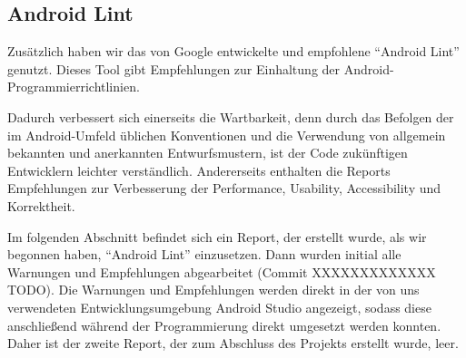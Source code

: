 



\clearpage
\subsection{Android Lint}

Zusätzlich haben wir das von Google entwickelte und empfohlene ``Android Lint''
genutzt. Dieses Tool gibt Empfehlungen zur Einhaltung der Android-Programmierrichtlinien.

Dadurch verbessert sich einerseits die Wartbarkeit, denn durch das Befolgen der im Android-Umfeld üblichen
 Konventionen und die Verwendung von allgemein bekannten und anerkannten Entwurfsmustern, ist der Code zukünftigen
Entwicklern leichter verständlich.
Andererseits enthalten die Reports Empfehlungen zur Verbesserung der Performance, Usability, Accessibility und Korrektheit.

Im folgenden Abschnitt befindet sich ein Report, der erstellt wurde,
als wir begonnen haben, ``Android Lint'' einzusetzen. Dann wurden initial alle
Warnungen und Empfehlungen abgearbeitet (Commit XXXXXXXXXXXXX TODO).
Die Warnungen und Empfehlungen werden direkt in der von uns verwendeten
Entwicklungsumgebung Android Studio angezeigt, sodass diese anschließend während
der Programmierung direkt umgesetzt werden konnten. Daher ist der zweite Report,
der zum Abschluss des Projekts erstellt wurde, leer.






%


